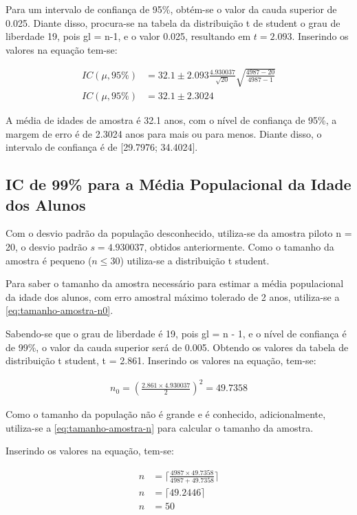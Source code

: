 	Para um intervalo de confiança de 95\%, obtém-se o valor da cauda
	superior de \num{0,025}. Diante disso, procura-se na tabela da distribuição
	t de student o grau de liberdade 19, pois gl = n-1, e o valor \num{0,025},
	resultando em $t = \num{2,093}$. Inserindo os valores na equação
	tem-se:

	\begin{align*}
		IC (\mu, 95\%) &= \num{32,1} \pm \num{2,093} \frac{\num{4,930037}}{\sqrt{20}} \sqrt{\frac{4987 - 20}{4987 - 1}} \\
		IC (\mu, 95\%) &= \num{32,1} \pm \num{2,3024}
	\end{align*}

	A média de idades de amostra é \num{32,1} anos, com o nível de confiança de
	95\%, a margem de erro é de \num{2,3024} anos para mais ou para menos. Diante
	disso, o intervalo de confiança é de [\num{29,7976}; \num{34,4024}].

\subsection{IC de 99\% para a Média Populacional da Idade dos Alunos}

	Com o desvio padrão da população desconhecido, utiliza-se da amostra
	piloto n = 20, o desvio padrão $s = \num{4,930037}$, obtidos anteriormente. Como o
	tamanho da amostra é pequeno ($n \leq 30$) utiliza-se a distribuição t student.

	Para saber o tamanho da amostra necessário para estimar a média
	populacional da idade dos alunos, com erro amostral máximo tolerado de 2
	anos, utiliza-se a \autoref{eq:tamanho-amostra-n0}.

	Sabendo-se que o grau de liberdade é 19, pois gl = n - 1, e o nível de
	confiança é de 99\%, o valor da cauda superior será de \num{0,005}. Obtendo os
	valores da tabela de distribuição t student, t = \num{2,861}.
	Inserindo os valores na equação, tem-se:

	\begin{align*}
		n_0 = \left (\frac{\num{2,861} \times \num{4,930037}}{2} \right)^2 = \num{49,7358}
	\end{align*}

	Como o tamanho da população não é grande e é conhecido, adicionalmente,
	utiliza-se a \autoref{eq:tamanho-amostra-n} para calcular o tamanho da amostra.

	Inserindo os valores na equação, tem-se:

	\begin{align*}
		n &= \Big\lceil \frac{4987 \times \num{49,7358}}{4987 + \num{49,7358}} \Big\rceil \\
		n &= \lceil \num{49,2446} \rceil \\
		n &= 50
	\end{align*}

